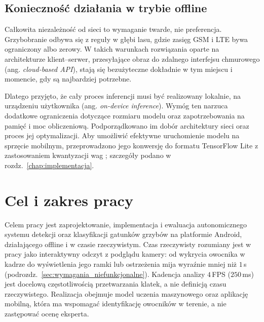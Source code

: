 \subsection{Konieczność działania w trybie offline}
Całkowita niezależność od sieci to wymaganie twarde, nie preferencja. Grzybobranie odbywa się z reguły w głębi lasu, gdzie zasięg GSM i LTE bywa ograniczony albo zerowy. W takich warunkach rozwiązania oparte na architekturze klient–serwer, przesyłające obraz do zdalnego interfejsu chmurowego (ang. \textit{cloud-based API}), stają się bezużyteczne dokładnie w tym miejscu i momencie, gdy są najbardziej potrzebne.

Dlatego przyjęto, że cały proces inferencji musi być realizowany lokalnie, na urządzeniu użytkownika (ang. \textit{on-device inference}). Wymóg ten narzuca dodatkowe ograniczenia dotyczące rozmiaru modelu oraz zapotrzebowania na pamięć i moc obliczeniową. Podporządkowano im dobór architektury sieci oraz proces jej optymalizacji. Aby umożliwić efektywne uruchomienie modelu na sprzęcie mobilnym, przeprowadzono jego konwersję do formatu TensorFlow Lite z zastosowaniem kwantyzacji wag \cite{tflite}; szczegóły podano w rozdz.~\ref{chap:implementacja}.

\section{Cel i zakres pracy}
Celem pracy jest zaprojektowanie, implementacja i ewaluacja autonomicznego systemu detekcji oraz klasyfikacji gatunków grzybów na platformie Android, działającego offline i w czasie rzeczywistym. Czas rzeczywisty rozumiany jest w pracy jako interaktywny odczyt z podglądu kamery: od wykrycia owocnika w kadrze do wyświetlenia jego ramki lub ostrzeżenia mija wyraźnie mniej niż $1$\,s (podrozdz.~\ref{sec:wymagania_niefunkcjonalne}). Kadencja analizy $4$\,FPS ($250$\,ms) jest docelową częstotliwością przetwarzania klatek, a nie definicją czasu rzeczywistego. Realizacja obejmuje model uczenia maszynowego oraz aplikację mobilną, która ma wspomagać identyfikację owocników w terenie, a nie zastępować ocenę eksperta.


